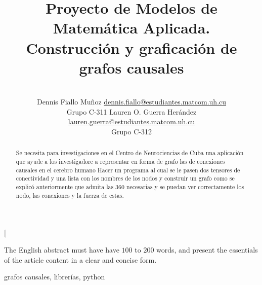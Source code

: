 \documentclass[a4paper,10pt,twocolumn]{article}
\title{Proyecto de Modelos de Matemática Aplicada. \\Construcción y graficación de grafos causales}
\author{\\
\name Dennis Fiallo Muñoz \email \href{mailto: dennis.fiallo@estudiantes.matcom.uh.cu}{dennis.fiallo@estudiantes.matcom.uh.cu}
	\\ \addr Grupo C-311 \AND
\name Lauren O. Guerra Herández \email \href{mailto:lauren.guerra@estudiantes.matcom.uh.cu}{lauren.guerra@estudiantes.matcom.uh.cu}
  \\ \addr Grupo C-312}
\begin{document}
\twocolumn[

\maketitle


\begin{abstract}

	Se necesita para investigaciones en el Centro de Neurociencias de Cuba una aplicación que ayude a los investigadore a representar en forma de grafo las de conexiones causales en el cerebro humano Hacer un programa al cual se le pasen dos tensores de conectividad y una lista con los nombres de los nodos y construir un grafo como se explicó anteriormente que admita las 360 necesarias y se puedan ver correctamente los nodo, las conexiones y la fuerza de estas.


\end{abstract}

\vspace{0.5cm}

\begin{enabstract}

  The English abstract must have have $100$ to $200$ words, and present 
  the essentials of the article content in a clear and concise form.

\end{enabstract}

\begin{keywords}
	grafos causales,
	librerías,
	python
\end{keywords}
\end{document}
